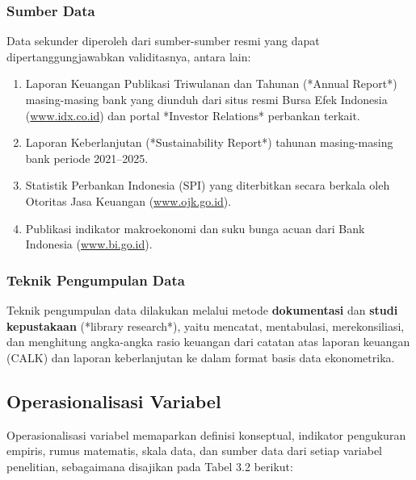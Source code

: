 \documentclass[12pt,a4paper]{article}
\numberwithin{equation}{section}
\begin{document}
\subsubsection{Sumber Data}
\noindent
Data sekunder diperoleh dari sumber-sumber resmi yang dapat dipertanggungjawabkan validitasnya, antara lain:
\begin{enumerate}
  \item Laporan Keuangan Publikasi Triwulanan dan Tahunan (*Annual Report*) masing-masing bank yang diunduh dari situs resmi Bursa Efek Indonesia (\url{www.idx.co.id}) dan portal *Investor Relations* perbankan terkait.
  \item Laporan Keberlanjutan (*Sustainability Report*) tahunan masing-masing bank periode 2021--2025.
  \item Statistik Perbankan Indonesia (SPI) yang diterbitkan secara berkala oleh Otoritas Jasa Keuangan (\url{www.ojk.go.id}).
  \item Publikasi indikator makroekonomi dan suku bunga acuan dari Bank Indonesia (\url{www.bi.go.id}).
\end{enumerate}

\subsubsection{Teknik Pengumpulan Data}
\noindent
Teknik pengumpulan data dilakukan melalui metode \textbf{dokumentasi} dan \textbf{studi kepustakaan} (*library research*), yaitu mencatat, mentabulasi, merekonsiliasi, dan menghitung angka-angka rasio keuangan dari catatan atas laporan keuangan (CALK) dan laporan keberlanjutan ke dalam format basis data ekonometrika.

\subsection{Operasionalisasi Variabel}

\noindent
Operasionalisasi variabel memaparkan definisi konseptual, indikator pengukuran empiris, rumus matematis, skala data, dan sumber data dari setiap variabel penelitian, sebagaimana disajikan pada Tabel 3.2 berikut:
\end{document}
